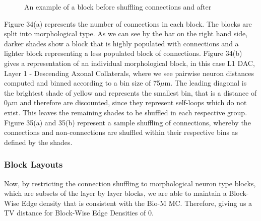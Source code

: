 \begin{figure}[H]%
    \centering
    \captionsetup{justification=centering}
    \qquad
    \caption{An example of a block before shuffling connections and after}%
    \label{fig:example}%
\end{figure}
Figure 34(a) represents the number of connections in each block. The blocks are split into morphological type. As we can see by the bar on the right hand side, darker shades show a block that is highly populated with connections and a lighter block representing a less populated block of connections.
Figure 34(b) gives a representation of an individual morphological block, in this case L1 DAC, Layer 1 - Descending Axonal Collaterals, where we see pairwise neuron distances computed and binned according to a bin size of 75$\mu$m. The leading diagonal is the brightest shade of yellow and represents the smallest bin, that is a distance of 0$\mu$m and therefore are discounted, since they represent self-loops which do not exist. This leaves the remaining shades to be shuffled in each respective group.
Figure 35(a) and 35(b) represent a sample shuffling of connections, whereby the connections and non-connections are shuffled within their respective bins as defined by the shades.
\subsubsection{Block Layouts}
Now, by restricting the connection shuffling to morphological neuron type blocks, which are subsets of the layer by layer blocks, we are able to maintain a Block-Wise Edge density that is consistent with the Bio-M MC. Therefore, giving us a TV distance for Block-Wise Edge Densities of 0.

